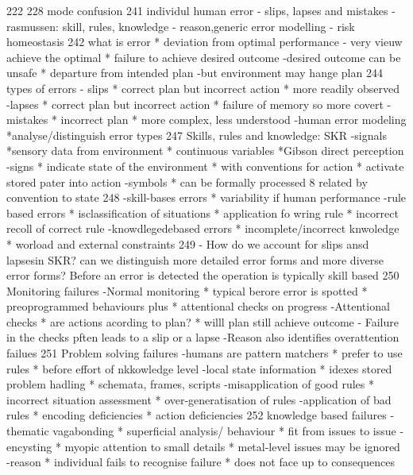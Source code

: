 222
228 mode confusion
241 individul human error
- slips, lapses and mistakes
- rasmussen: skill, rules, knowledge
- reason,generic error modelling
- risk homeostasis
242 what is error
* deviation from optimal performance
- very vieuw achieve the optimal
* failure to achieve desired outcome
-desired outcome can be unsafe
* departure from intended plan
-but environment may hange plan
244 types of errors
- slips
* correct plan but incorrect action
* more readily observed
-lapses
* correct plan but incorrect action
* failure of memory so more covert
-mistakes
* incorrect plan
* more complex, less understood
-human error modeling 
*analyse/distinguish error types
247 Skills, rules and knowledge: SKR
-signals
*sensory data from environment
* continuous variables
*Gibson direct perception
-signs
* indicate state of the environment
* with conventions for action
* activate stored pater into action
-symbols
* can be formally processed
8 related by convention to state
248
-skill-bases errors
* variability if human performance
-rule based errors
* isclassification of situations
* application fo wring rule
* incorrect recoll of correct rule
-knowdlegedebased errors
* incomplete/incorrect knwoledge
* worload and external constraints
249
- How do we account for slips ansd lapsesin SKR?
can we distinguish more detailed error forms and more diverse error forms?
Before an error is detected the operation is typically skill based
250 Monitoring failures
-Normal monitoring
* typical berore error is spotted
* preoprogrammed behaviours plus
* attentional checks on progress
-Attentional checks
* are actions acording to plan?
* willl plan still achieve outcome
- Failure in the checks pften leads to a slip or a lapse
-Reason also identifies overattention failues
251 Problem solving failures
-humans are pattern matchers
* prefer to use rules
* before effort of nkkowledge level
-local state information
* idexes stored problem hadling
* schemata, frames, scripts
-misapplication of good rules
* incorrect situation assessment
* over-generatisation of rules
-application of bad rules
* encoding deficiencies
* action deficiencies
252 knowledge based failures
-thematic vagabonding
* superficial analysis/ behaviour
* fit from issues to issue
-encysting
* myopic attention to small details
* metal-level issues may be ignored
-reason
* individual fails to recognise failure
* does not face up to consequences

